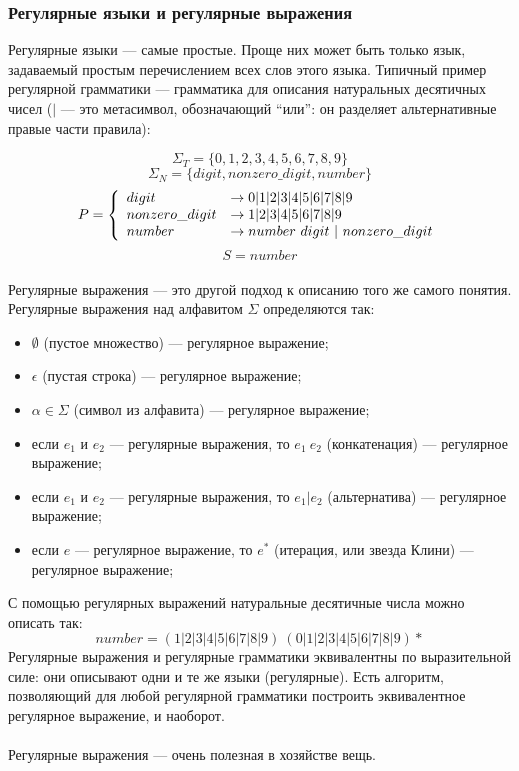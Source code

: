 \documentclass[11pt]{book}
\begin{document}
\subsubsection{Регулярные языки и регулярные выражения}
Регулярные языки --- самые простые.
Проще них может быть только язык, задаваемый простым перечислением всех слов этого языка.
Типичный пример регулярной грамматики --- грамматика для описания натуральных десятичных чисел
($|$ --- это метасимвол, обозначающий ``или'': он разделяет альтернативные правые части правила):

$$\Sigma_T=\{0,1,2,3,4,5,6,7,8,9\}$$
$$\Sigma_N=\{digit,nonzero\_digit,number\}$$
$$P=\left\{
\begin{array}{l l}
digit & \rightarrow 0|1|2|3|4|5|6|7|8|9
\\
nonzero\_digit & \rightarrow 1|2|3|4|5|6|7|8|9
\\
number & \rightarrow number \ digit \ | \ nonzero\_digit
\end{array}
\right. $$
$$S=number$$
\\
Регулярные выражения --- это другой подход к описанию того же самого понятия.
Регулярные выражения над алфавитом $\Sigma$ определяются так:
\begin{itemize}
\item $\emptyset$ (пустое множество) --- регулярное выражение;
\item $\epsilon$ (пустая строка) --- регулярное выражение;
\item $\alpha \in \Sigma$ (символ из алфавита) --- регулярное выражение;
\item если $e_1$ и $e_2$ --- регулярные выражения, то $e_1 \  e_2$ (конкатенация) --- регулярное выражение;
\item если $e_1$ и $e_2$ --- регулярные выражения, то $e_1 | e_2$ (альтернатива) --- регулярное выражение;
\item если $e$ --- регулярное выражение, то $e^*$ (итерация, или звезда Клини) --- регулярное выражение;
\end{itemize}
С помощью регулярных выражений натуральные десятичные числа можно описать так:
$$number = (1|2|3|4|5|6|7|8|9)\ (0|1|2|3|4|5|6|7|8|9)*$$
Регулярные выражения и регулярные грамматики эквивалентны по выразительной силе:
они описывают одни и те же языки (регулярные).
Есть алгоритм, позволяющий для любой регулярной грамматики построить эквивалентное регулярное выражение, и наоборот.
\\ \\
Регулярные выражения --- очень полезная в хозяйстве вещь.
\end{document}
